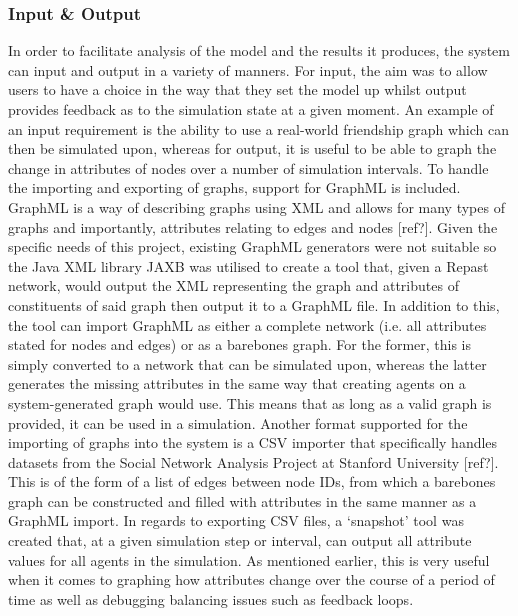 \documentclass[]{report}
\begin{document}
\subsubsection{Input \& Output}
In order to facilitate analysis of the model and the results it produces, the system can input and output in a variety of manners. For input, the aim was to allow users to have a choice in the way that they set the model up whilst output provides feedback as to the simulation state at a given moment. An example of an input requirement is the ability to use a real-world friendship graph which can then be simulated upon, whereas for output, it is useful to be able to graph the change in attributes of nodes over a number of simulation intervals. 
To handle the importing and exporting of graphs, support for GraphML is included. GraphML is a way of describing graphs using XML and allows for many types of graphs and importantly, attributes relating to edges and nodes [ref?]. Given the specific needs of this project, existing GraphML generators were not suitable so the Java XML library JAXB was utilised to create a tool that, given a Repast network, would output the XML representing the graph and attributes of constituents of said graph then output it to a GraphML file. In addition to this, the tool can import GraphML as either a complete network (i.e. all attributes stated for nodes and edges) or as a barebones graph. For the former, this is simply converted to a network that can be simulated upon, whereas the latter generates the missing attributes in the same way that creating agents on a system-generated graph would use. This means that as long as a valid graph is provided, it can be used in a simulation.
Another format supported for the importing of graphs into the system is a CSV importer that specifically handles datasets from the Social Network Analysis Project at Stanford University [ref?]. This is of the form of a list of edges between node IDs, from which a barebones graph can be constructed and filled with attributes in the same manner as a GraphML import. In regards to exporting CSV files, a `snapshot' tool was created that, at a given simulation step or interval, can output all attribute values for all agents in the simulation. As mentioned earlier, this is very useful when it comes to graphing how attributes change over the course of a period of time as well as debugging balancing issues such as feedback loops.
\end{document}
